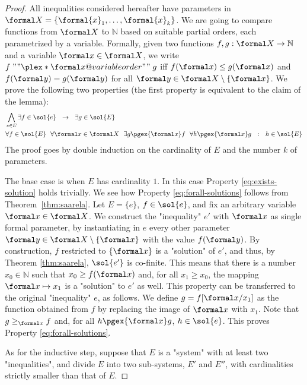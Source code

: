 \documentclass{theoretics}
\begin{document}
\begin{proof}
All inequalities considered hereafter have 
parameters in $\formal X=\{\formal{x}_1,\dots,\formal{x}_k\}$.
We are going to compare functions from $\formal X$ to $\mathbb{N}$
based on suitable partial orders, each parametrized by a variable. 
\AP
Formally, given two functions $f,g:\formal X\rightarrow\mathbb{N}$
and a variable $\formal x\in\formal X$, we write 
$f \mathrel{""\plex*{\formal x}@variable order""} g$ 
iff $f(\formal x) \le g(\formal x)$ and $f(\formal y) = g(\formal y)$ 
for all $\formal y\in\formal X\setminus\{\formal x\}$.
We prove the following two properties (the first property is equivalent to 
the claim of the lemma):
\begin{align}
  &\bigwedge_{e\in E}
    \exists f \in \sol{e}
    ~~\rightarrow~~
   \exists g \in \sol{E}
  \label{eq:exists-solution}
  \\
  &\forall f \in \sol{E} ~~
  \forall \formal x\in\formal X ~~
  \exists g \pgex{\formal x} f ~~
  \forall h \pgex{\formal x} g ~~:~~
  h \in \sol{E} 
  \label{eq:forall-solutions}
\end{align}
The proof goes by  double induction on the cardinality of $E$ 
and the number $k$ of parameters.

The base case is when $E$ has cardinality $1$.
In this case Property \eqref{eq:exists-solution} holds trivially.
We see how Property \eqref{eq:forall-solutions} follows from Theorem~\ref{thm:saarela}.
Let $E=\{e\}$, $f\in\sol{e}$, and fix an arbitrary variable $\formal x\in\formal X$.
We construct the "inequality" $e'$ with $\formal x$ as single formal parameter, by 
instantiating in $e$ every other parameter $\formal y\in\formal X\setminus\{\formal x\}$
with the value $f(\formal y)$. 
By construction, $f$ restricted to $\{\formal x\}$ is a "solution" of $e'$, and thus, 
by Theorem \ref{thm:saarela}, $\sol{e'}$ is co-finite. 
This means that there is a number $x_0\in\mathbb{N}$ such that $x_0 \ge f(\formal x)$ 
and, for all $x_1 \ge x_0$, the mapping $\formal x\mapsto x_1$ is a "solution" to $e'$ as well.
This property can be transferred to the original "inequality" $e$, as follows.
We define $g = f[\formal x / x_1]$ as the function obtained from $f$ by replacing
the image of $\formal x$ with $x_1$. Note that $g \ge_{\formal x} f$ and,
for all $h \pgex{\formal x} g$, $h\in\sol{e}$. This proves Property \eqref{eq:forall-solutions}.

As for the inductive step, suppose that $E$ is a "system" with at least two "inequalities",
and divide $E$ into two sub-systems, $E'$ and $E''$, with cardinalities strictly 
smaller than that of $E$.


\end{proof}
\end{document}
